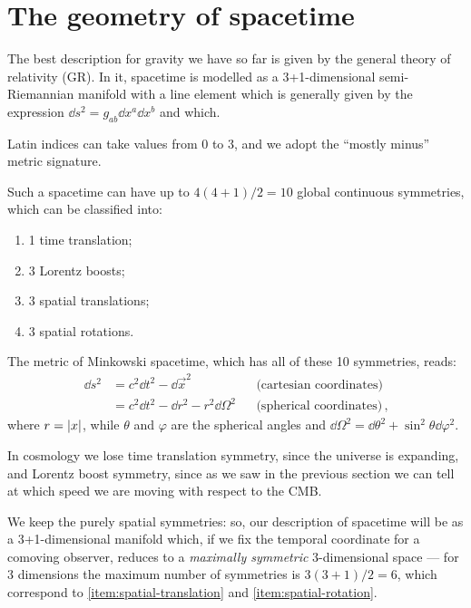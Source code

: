 \documentclass[main.tex]{subfiles}
\begin{document}
\section{The geometry of spacetime}

The best description for gravity we have so far is given by the general theory of relativity (GR).
In it, spacetime is modelled as a 3+1-dimensional semi-Riemannian manifold with a line element which is  generally given by the expression \(\dd{s^2} = g_{ab} \dd{x^a} \dd{x^b} \) and which.

Latin indices can take values from 0 to 3, and we adopt the ``mostly minus'' metric signature.

Such a spacetime can have up to \(4(4+1) / 2 = 10\) global continuous symmetries, which can be classified into:
\begin{enumerate}[label=(\alph*)]
  \item 1 time translation; \label{item:time-translation}
  \item 3 Lorentz boosts; \label{item:lorentz-boost}
  \item 3 spatial translations; \label{item:spatial-translation}
  \item 3 spatial rotations. \label{item:spatial-rotation}
\end{enumerate}

The metric of Minkowski spacetime, which has all of these 10 symmetries, reads: 
%
\begin{subequations}
\begin{align}
\dd{s^2} &= c^2 \dd{t^2} - \dd{\vec{x}^2} && \text{(cartesian coordinates)} \\
&= c^2 \dd{t^2} - \dd{r^2} - r^2 \dd{\Omega^2} && \text{(spherical coordinates)}
\,,
\end{align}
\end{subequations}
%
where \(r = \abs{x}\), while \(\theta \) and \(\varphi \) are the spherical angles and \(\dd{\Omega^2} = \dd{\theta^2} + \sin^2\theta \dd{\varphi^2 }\).

In cosmology we lose time translation symmetry, since the universe is expanding, and Lorentz boost symmetry, since as we saw in the previous section we can tell at which speed we are moving with respect to the CMB.

We keep the purely spatial symmetries: so, our description of spacetime will be as a 3+1-dimensional manifold which, if we fix the temporal coordinate for a comoving observer, reduces to a \emph{maximally symmetric} 3-dimensional space --- for 3 dimensions the maximum number of symmetries is \(3(3+1) / 2 = 6\), which correspond to \ref{item:spatial-translation} and \ref{item:spatial-rotation}. 
\end{document}
